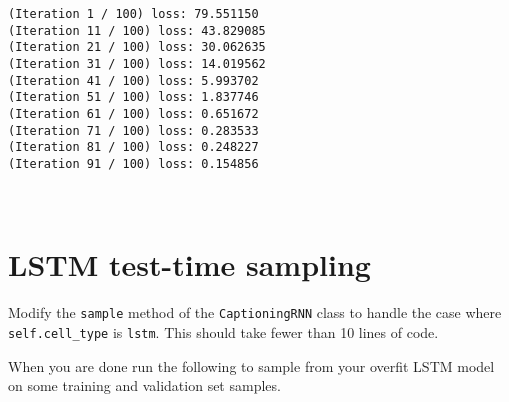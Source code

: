 \documentclass[11pt]{article}
\begin{document}
    \begin{Verbatim}[commandchars=\\\{\}]
(Iteration 1 / 100) loss: 79.551150
(Iteration 11 / 100) loss: 43.829085
(Iteration 21 / 100) loss: 30.062635
(Iteration 31 / 100) loss: 14.019562
(Iteration 41 / 100) loss: 5.993702
(Iteration 51 / 100) loss: 1.837746
(Iteration 61 / 100) loss: 0.651672
(Iteration 71 / 100) loss: 0.283533
(Iteration 81 / 100) loss: 0.248227
(Iteration 91 / 100) loss: 0.154856

    \end{Verbatim}

    \begin{center}
    \end{center}
    { \hspace*{\fill} \\}
    
    \hypertarget{lstm-test-time-sampling}{%
\section{LSTM test-time sampling}\label{lstm-test-time-sampling}}

Modify the \texttt{sample} method of the \texttt{CaptioningRNN} class to
handle the case where \texttt{self.cell\_type} is \texttt{lstm}. This
should take fewer than 10 lines of code.

When you are done run the following to sample from your overfit LSTM
model on some training and validation set samples.
\end{document}
